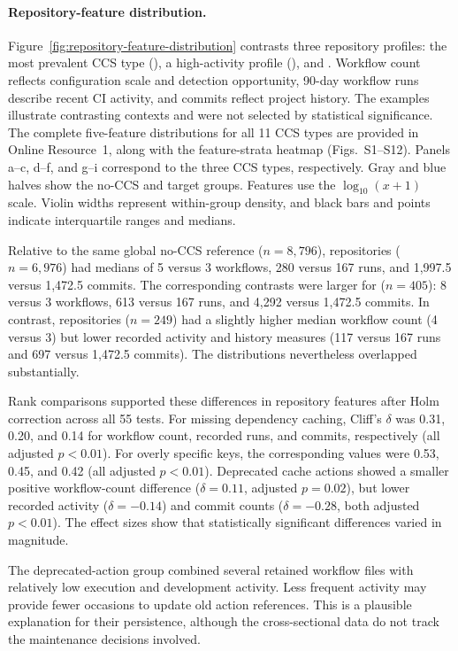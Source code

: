 \documentclass[smallextended]{svjour3}
\begin{document}
\paragraph{Repository-feature distribution.}
Figure~\ref{fig:repository-feature-distribution} contrasts three repository profiles: the most prevalent CCS type (), a high-activity profile (), and . Workflow count reflects configuration scale and detection opportunity, 90-day workflow runs describe recent CI activity, and commits reflect project history. The examples illustrate contrasting contexts and were not selected by statistical significance. The complete five-feature distributions for all 11 CCS types are provided in Online Resource~1, along with the feature-strata heatmap (Figs.~S1--S12). Panels a--c, d--f, and g--i correspond to the three CCS types, respectively. Gray and blue halves show the no-CCS and target groups. Features use the $\log_{10}(x+1)$ scale. Violin widths represent within-group density, and black bars and points indicate interquartile ranges and medians.

Relative to the same global no-CCS reference ($n=8{,}796$),  repositories ($n=6{,}976$) had medians of 5 versus 3 workflows, 280 versus 167 runs, and 1,997.5 versus 1,472.5 commits. The corresponding contrasts were larger for  ($n=405$): 8 versus 3 workflows, 613 versus 167 runs, and 4,292 versus 1,472.5 commits. In contrast,  repositories ($n=249$) had a slightly higher median workflow count (4 versus 3) but lower recorded activity and history measures (117 versus 167 runs and 697 versus 1,472.5 commits). The distributions nevertheless overlapped substantially.

Rank comparisons supported these differences in repository features after Holm correction across all 55 tests. For missing dependency caching, Cliff's $\delta$ was 0.31, 0.20, and 0.14 for workflow count, recorded runs, and commits, respectively (all adjusted $p<0.01$). For overly specific keys, the corresponding values were 0.53, 0.45, and 0.42 (all adjusted $p<0.01$). Deprecated cache actions showed a smaller positive workflow-count difference ($\delta=0.11$, adjusted $p=0.02$), but lower recorded activity ($\delta=-0.14$) and commit counts ($\delta=-0.28$, both adjusted $p<0.01$). The effect sizes show that statistically significant differences varied in magnitude.

The deprecated-action group combined several retained workflow files with relatively low execution and development activity. Less frequent activity may provide fewer occasions to update old action references. This is a plausible explanation for their persistence, although the cross-sectional data do not track the maintenance decisions involved.
\end{document}
